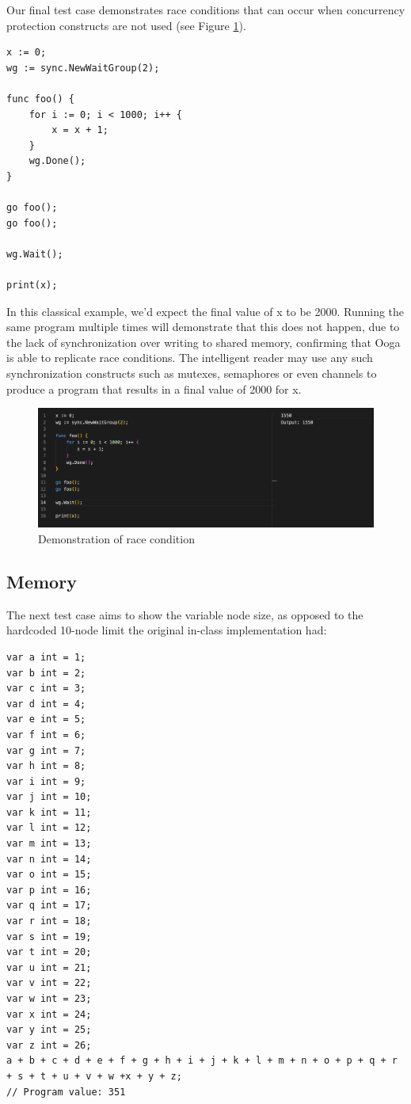 \documentclass{report}
\begin{document}
Our final test case demonstrates race conditions that can occur when concurrency protection constructs are not used (see Figure \ref{fig:race-condition}).

\begin{verbatim}
x := 0;
wg := sync.NewWaitGroup(2);

func foo() {
    for i := 0; i < 1000; i++ {
        x = x + 1;
    }
    wg.Done();
}

go foo();
go foo();

wg.Wait();

print(x);
\end{verbatim}

In this classical example, we'd expect the final value of x to be 2000. Running the same program multiple times will demonstrate that this does not happen, due to the lack of synchronization over writing to shared memory, confirming that Ooga is able to replicate race conditions. The intelligent reader may use any such synchronization constructs such as mutexes, semaphores or even channels to produce a program that results in a final value of 2000 for x.

\begin{figure}
    \centering
    \includegraphics[width=\textwidth]{images/ooga-race-condition.png}
    \caption{Demonstration of race condition}
    \label{fig:race-condition}
\end{figure}

\subsection{Memory}

The next test case aims to show the variable node size, as opposed to the hardcoded 10-node limit the original in-class implementation had:
\begin{verbatim}
var a int = 1;
var b int = 2;
var c int = 3;
var d int = 4;
var e int = 5;
var f int = 6;
var g int = 7;
var h int = 8;
var i int = 9;
var j int = 10;
var k int = 11;
var l int = 12;
var m int = 13;
var n int = 14;
var o int = 15;
var p int = 16;
var q int = 17;
var r int = 18;
var s int = 19;
var t int = 20;
var u int = 21;
var v int = 22;
var w int = 23;
var x int = 24;
var y int = 25;
var z int = 26;
a + b + c + d + e + f + g + h + i + j + k + l + m + n + o + p + q + r + s + t + u + v + w +x + y + z;
// Program value: 351
\end{verbatim}
\end{document}
